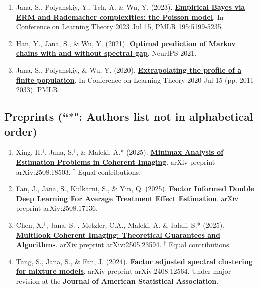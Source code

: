 \documentclass[letterpaper,12pt,oneside]{article}
\theoremstyle{definition}
\begin{document}
			\begin{enumerate}
				\item Jana, S., Polyanskiy, Y., Teh, A. \& Wu, Y. (2023). \href{https://arxiv.org/abs/2307.02070}{\bf Empirical Bayes via ERM and Rademacher complexities: the Poisson model}. In Conference on Learning Theory 2023 Jul 15, PMLR 195:5199-5235.
				
				\item Han, Y., Jana, S., \& Wu, Y. (2021). \href{https://arxiv.org/abs/2106.13947}{\bf Optimal prediction of Markov chains with and without spectral gap}. NeurIPS 2021.
				
				\item Jana, S., Polyanskiy, \& Wu, Y. (2020). \href{https://arxiv.org/abs/2005.10561}{\bf Extrapolating the profile of a finite population}. In Conference on Learning Theory 2020 Jul 15 (pp. 2011-2033). PMLR.
			\end{enumerate}
			
			\subsection*{Preprints {\normalfont (``$\ast$": Authors list not in alphabetical order)}} 
			
			\begin{enumerate}
				
				\item Xing, H.$^\dagger$, Jana, S.$^\dagger$, \& Maleki, A.* (2025). \href{https://arxiv.org/abs/2508.18503}{\bf Minimax Analysis of Estimation Problems in Coherent Imaging}. arXiv preprint arXiv:2508.18503. $^\dagger$ Equal contributions.
				
				\item Fan, J., Jana, S., Kulkarni, S., \& Yin, Q. (2025). \href{https://janasoham.github.io/files/fiddle.pdf}{\bf Factor Informed Double Deep Learning For Average Treatment Effect Estimation}. arXiv preprint arXiv:2508.17136.
				
				\item Chen, X.$^\dagger$, Jana, S.$^\dagger$, Metzler, C.A., Maleki, A. \& Jalali, S.* (2025). \href{https://arxiv.org/abs/2505.23594}{\bf Multilook Coherent Imaging: Theoretical Guarantees and Algorithms}. arXiv preprint arXiv:2505.23594. $^\dagger$ Equal contributions.
				
				\item Tang, S., Jana, S., \& Fan, J. (2024). \href{https://www.arxiv.org/abs/2408.12564}{\bf Factor adjusted spectral clustering for mixture models}. arXiv preprint arXiv:2408.12564. Under major revision at the {\bf Journal of American Statistical Association}.
				
				
			\end{enumerate}
			
\end{document}
